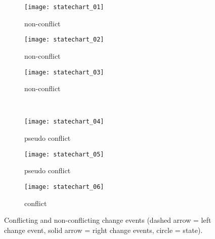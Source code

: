 \begin{figure*}[ht]
  \begin{subfigure}[t]{0.32\linewidth}
    \texttt{[image: statechart\_01]}
    \caption{non-conflict}
    \label{fig:statechart_01}
  \end{subfigure}
  \hfill
  \begin{subfigure}[t]{0.32\linewidth}
    \texttt{[image: statechart\_02]}
    \caption{non-conflict}
    \label{fig:statechart_02}
  \end{subfigure}
  \hfill
  \begin{subfigure}[t]{0.32\linewidth}
    \texttt{[image: statechart\_03]}
    \caption{non-conflict}
    \label{fig:statechart_03}
  \end{subfigure}
  \\
  \begin{subfigure}[t]{0.32\linewidth}
    \texttt{[image: statechart\_04]}
    \caption{pseudo conflict}
    \label{fig:statechart_04}
  \end{subfigure}
  \hfill
  \begin{subfigure}[t]{0.32\linewidth}
    \texttt{[image: statechart\_05]}
    \caption{pseudo conflict}
    \label{fig:statechart_05}
  \end{subfigure}
  \hfill
  \begin{subfigure}[t]{0.32\linewidth}
    \texttt{[image: statechart\_06]}
    \caption{conflict}
    \label{fig:statechart_06}
  \end{subfigure}
  \caption{Conflicting and non-conflicting change events (dashed arrow = left change event, solid arrow = right change events, circle = state).}
  \label{fig:conflict_states}
\end{figure*}

